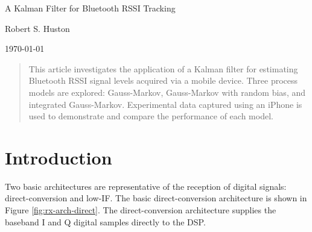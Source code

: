\documentclass[12pt]{article}
\begin{document}
\setlength{\parskip}{12pt}      %



\begin{titlepage}
    \begin{center}
        \vspace*{\fill}
        
        \huge
        A Kalman Filter for Bluetooth RSSI Tracking
        
        \vspace{36pt}

        \large
        Robert S. Huston

        \vspace{36pt}
        
        \today
        
        \vfill
    \end{center}
\end{titlepage}



\begin{abstract}
This article investigates the application of a Kalman filter for estimating Bluetooth
RSSI signal levels acquired via a mobile device. Three process models are explored:
Gauss-Markov, Gauss-Markov with random bias, and integrated Gauss-Markov. Experimental
data captured using an iPhone is used to demonstrate and compare the performance of each
model.
\end{abstract}



\clearpage
\tableofcontents



%
%

\clearpage
\section{Introduction}

Two basic architectures are representative of the reception of digital signals:
direct-conversion and low-IF. The basic direct-conversion architecture is shown in
Figure \ref{fig:rx-arch-direct}. The direct-conversion architecture supplies the baseband
I and Q digital samples directly to the DSP.
\end{document}
